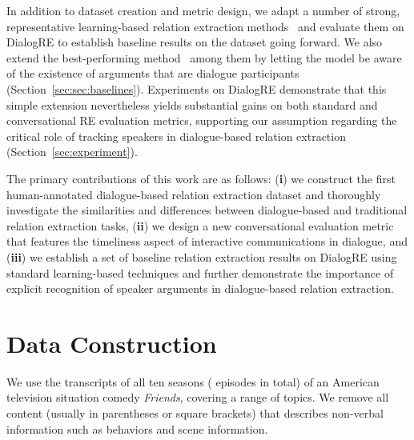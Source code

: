 \documentclass[11pt,a4paper]{article}
\begin{document}
In addition to dataset creation and metric design, we adapt a number of strong, representative learning-based relation extraction methods~\cite{zeng2014relation,cai2016bidirectional,yao2019docred,bert2018} and evaluate them on DialogRE to establish baseline results on the dataset going forward. We also extend the best-performing method~\cite{bert2018} among them by letting the model be aware of the existence of arguments that are dialogue participants (Section~\ref{sec:sec:baselines}). Experiments on DialogRE demonstrate that this simple extension nevertheless yields substantial gains on both standard and conversational RE evaluation metrics, supporting our assumption regarding the critical role of tracking speakers in dialogue-based relation extraction (Section~\ref{sec:experiment}).



The primary contributions of this work are as follows: (\textbf{i}) we construct the first human-annotated dialogue-based relation extraction dataset and thoroughly investigate the similarities and differences between dialogue-based and traditional relation extraction tasks, (\textbf{ii}) we design a new conversational evaluation metric that features the timeliness aspect of interactive communications in dialogue, and (\textbf{iii}) we establish a set of baseline relation extraction results on DialogRE using standard learning-based techniques and further demonstrate the importance of explicit recognition of speaker arguments in dialogue-based relation extraction.













































 \section{Data Construction}
\label{sec:construction}
We use the transcripts of all ten seasons ( episodes in total) of an American television situation comedy \emph{Friends}, covering a range of topics. We remove all content (usually in parentheses or square brackets) that describes non-verbal information such as behaviors and scene information. 
\end{document}
